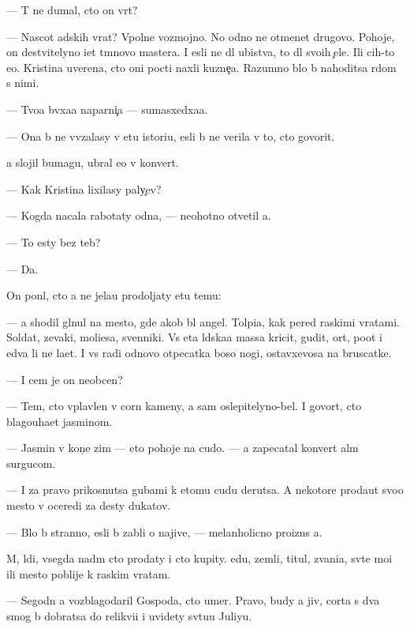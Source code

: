 \documentclass[10pt]{book}
\begin{document}
— T{\yi} ne dumal, cto on vr{\e}t?

— Nascot adskih vrat? Vpolne vozmojno. No odno ne otmen{\ia}{\y}et drugovo. Pohoje, on de{\y}stvitelyno i{\x}et t{\e}mnovo mastera. I {\y}esli ne dl{\ia} ubi{\y}stva, to dl{\ia} svo{\y}ih {\c}ele{\y}. Ili c{\yf}ih-to {\y}e{\x}o. Kristina uverena, cto oni pocti naxli kuzne{\c}a. Razumno b{\yi}lo b{\yi} nahoditsa r{\ia}dom s nimi.

— Tvo{\y}a b{\yi}vxa{\y}a naparni{\c}a — sumasxedxa{\y}a.

— Ona b{\yi} ne vv{\ia}zalasy v etu istori{\y}u, {\y}esli b{\yi} ne verila v to, cto govorit.

{\Y}a slojil bumagu, ubral {\y}e{\y}o v konvert.

— Kak Kristina lixilasy paly{\c}ev?

— Kogda nacala rabotaty odna, — neohotno otvetil {\y}a.

— To {\y}esty bez teb{\ia}?

— Da.

On pon{\ia}l, cto {\y}a ne jela{\y}u prodoljaty etu temu:

— {\Y}a shodil gl{\ia}nul na mesto, gde {\y}akob{\yi} b{\yi}l angel. Tolpi{\x}a, kak pered ra{\y}skimi vratami. Soldat{\yi}, zevaki, mol{\ia}{\x}i{\y}esa, sv{\ia}{\x}enniki. Vs{\ia} eta l{\iu}dska{\y}a massa kricit, gudit, or{\e}t, po{\y}ot i {\y}edva li ne la{\y}et. I vs{\e} radi odnovo otpecatka boso{\y} nogi, ostavxevosa na bruscatke.

— I cem je on neob{\yi}cen?

— Tem, cto vplavlen v corn{\yi}{\y} kameny, a sam oslepitelyno-bel. I govor{\ia}t, cto blagouha{\y}et jasminom.

— Jasmin v kon{\c}e zim{\yi} — eto pohoje na cudo. — {\Y}a zapecatal konvert al{\yi}m surgucom.

— I za pravo prikosnutsa gubami k etomu cudu derutsa. A nekotor{\yi}{\y}e proda{\y}ut svo{\y}o mesto v oceredi za des{\ia}ty dukatov.

— B{\yi}lo b{\yi} stranno, {\y}esli b{\yi} zab{\yi}li o najive, — melanholicno proizn{\e}s {\y}a.

M{\yi}, l{\iu}di, vsegda na{\y}d{\e}m cto prodaty i cto kupity. {\Y}edu, zemli, titul{\yi}, zvani{\y}a, sv{\ia}t{\yi}{\y}e mo{\x}i ili mesto poblije k ra{\y}skim vratam.

— Segodn{\ia} {\y}a vozblagodaril Gospoda, cto umer. Pravo, budy {\y}a jiv, corta s dva smog b{\yi} dobratsa do relikvi{\y}i i uvidety sv{\ia}tu{\y}u Juliyu.
\end{document}
